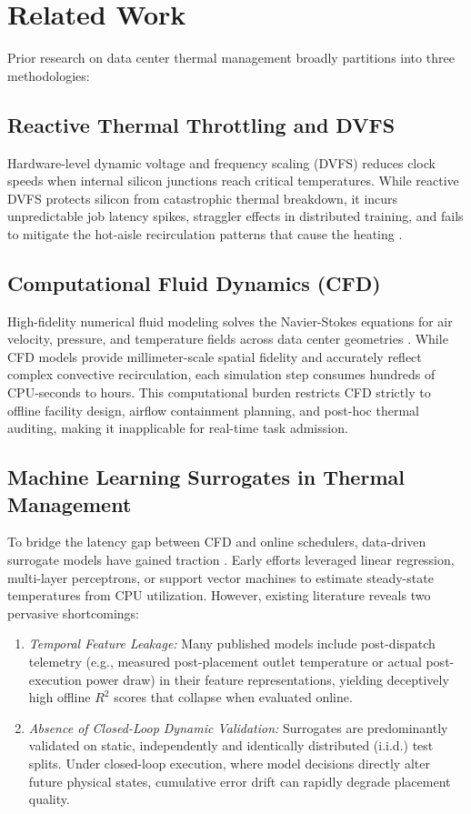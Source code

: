 \documentclass[conference,10pt]{IEEEtran}
\begin{document}
\section{Related Work}
\label{sec:related}
Prior research on data center thermal management broadly partitions into three methodologies:

\subsection{Reactive Thermal Throttling and DVFS}
Hardware-level dynamic voltage and frequency scaling (DVFS) reduces clock speeds when internal silicon junctions reach critical temperatures. While reactive DVFS protects silicon from catastrophic thermal breakdown, it incurs unpredictable job latency spikes, straggler effects in distributed training, and fails to mitigate the hot-aisle recirculation patterns that cause the heating \cite{tang2008thermal}.

\subsection{Computational Fluid Dynamics (CFD)}
High-fidelity numerical fluid modeling solves the Navier-Stokes equations for air velocity, pressure, and temperature fields across data center geometries \cite{choi2008cfd}. While CFD models provide millimeter-scale spatial fidelity and accurately reflect complex convective recirculation, each simulation step consumes hundreds of CPU-seconds to hours. This computational burden restricts CFD strictly to offline facility design, airflow containment planning, and post-hoc thermal auditing, making it inapplicable for real-time task admission.

\subsection{Machine Learning Surrogates in Thermal Management}
To bridge the latency gap between CFD and online schedulers, data-driven surrogate models have gained traction \cite{moore2005temperature, zhou2018thermal}. Early efforts leveraged linear regression, multi-layer perceptrons, or support vector machines to estimate steady-state temperatures from CPU utilization. However, existing literature reveals two pervasive shortcomings:
\begin{enumerate}
    \item \textit{Temporal Feature Leakage:} Many published models include post-dispatch telemetry (e.g., measured post-placement outlet temperature or actual post-execution power draw) in their feature representations, yielding deceptively high offline $R^2$ scores that collapse when evaluated online.
    \item \textit{Absence of Closed-Loop Dynamic Validation:} Surrogates are predominantly validated on static, independently and identically distributed (i.i.d.) test splits. Under closed-loop execution, where model decisions directly alter future physical states, cumulative error drift can rapidly degrade placement quality.
\end{enumerate}
\end{document}
